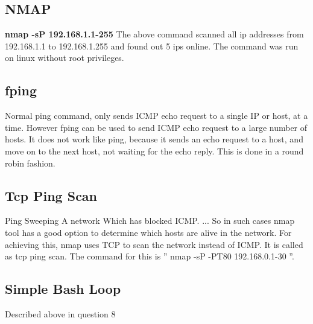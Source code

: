 \documentclass{article}
\begin{document}
\subsection{NMAP}
\textbf{nmap -sP 192.168.1.1-255}
The above command scanned all ip addresses from 192.168.1.1 to 192.168.1.255 and found out 5 ips online. The command was run on linux without root privileges.
\subsection{fping}
Normal ping command, only sends ICMP echo request to a single IP or host, at a time. However fping can be used to send ICMP echo request to a large number of hosts. It does not work like ping, because it sends an echo request to a host, and move on to the next host, not waiting for the echo reply. This is done in a round robin fashion.
\subsection{Tcp Ping Scan}
Ping Sweeping A network Which has blocked ICMP. ... So in such cases nmap tool has a good option to determine which hosts are alive in the network. For achieving this, nmap uses TCP to scan the network instead of ICMP. It is called as tcp ping scan. The command for this is ” nmap -sP -PT80 192.168.0.1-30
”.
\subsection{Simple Bash Loop}
Described above in question 8
\end{document}
